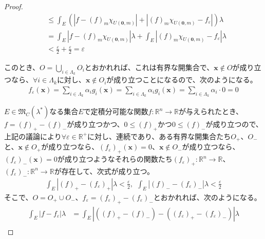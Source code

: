 \documentclass[dvipdfmx]{jsarticle}
\begin{document}
\begin{proof}
\begin{align*}
&\leq \int_{E} {\left( \left| f - (f)_{m}\chi_{U\left( \mathbf{0},m \right)} \right| + \left| (f)_{m}\chi_{U\left( \mathbf{0},m \right)} - f_{\varepsilon} \right| \right)\lambda}\\
&= \int_{E} {\left| f - (f)_{m}\chi_{U\left( \mathbf{0},m \right)} \right|\lambda} + \int_{E} {\left| (f)_{m}\chi_{U\left( \mathbf{0},m \right)} - f_{\varepsilon} \right|\lambda}\\
&< \frac{\varepsilon}{2} + \frac{\varepsilon}{2} = \varepsilon
\end{align*}\par
このとき、$O = \bigcup_{i \in \varLambda_{k}} O_{i}$とおかれれば、これは有界な開集合で、$\mathbf{x} \notin O$が成り立つなら、$\forall i \in \varLambda_{k}$に対し、$\mathbf{x} \notin O_{i}$が成り立つことになるので、次のようになる。
\begin{align*}
f_{\varepsilon}\left( \mathbf{x} \right) = \sum_{i \in \varLambda_{k}} {\alpha_{i}g_{i}}\left( \mathbf{x} \right) = \sum_{i \in \varLambda_{k}} {\alpha_{i}g_{i}\left( \mathbf{x} \right)} = \sum_{i \in \varLambda_{k}} {\alpha_{i} \cdot 0} = 0
\end{align*}\par
$E \in \mathfrak{M}_{C}\left( \lambda^{*} \right)$なる集合$E$で定積分可能な関数$f:\mathbb{R}^{n} \rightarrow \mathbb{R}$が与えられたとき、$f = (f)_{+} - (f)_{-}$が成り立つかつ、$0 \leq (f)_{+}$かつ$0 \leq (f)_{-}$が成り立つので、上記の議論により$\forall\varepsilon \in \mathbb{R}^{+}$に対し、連続であり、ある有界な開集合たち$O_{+}$、$O_{-}$と、$\mathbf{x} \notin O_{+}$が成り立つなら、$\left( f_{\varepsilon} \right)_{+}\left( \mathbf{x} \right) = 0$、$\mathbf{x} \notin O_{-}$が成り立つなら、$\left( f_{\varepsilon} \right)_{-}\left( \mathbf{x} \right) = 0$が成り立つようなそれらの関数たち$\left( f_{\varepsilon} \right)_{+}:\mathbb{R}^{n} \rightarrow \mathbb{R}$、$\left( f_{\varepsilon} \right)_{-}:\mathbb{R}^{n} \rightarrow \mathbb{R}$が存在して、次式が成り立つ。
\begin{align*}
\int_{E} {\left| (f)_{+} - \left( f_{\varepsilon} \right)_{+} \right|\lambda} < \frac{\varepsilon}{2},\ \ \int_{E} {\left| (f)_{-} - \left( f_{\varepsilon} \right)_{-} \right|\lambda} < \frac{\varepsilon}{2}
\end{align*}
そこで、$O = O_{+} \cup O_{-}$、$f_{\varepsilon} = \left( f_{\varepsilon} \right)_{+} - \left( f_{\varepsilon} \right)_{-}$とおかれれば、次のようになる。
\begin{align*}
\int_{E} {\left| f - f_{\varepsilon} \right|\lambda} &= \int_{E} {\left| \left( (f)_{+} - (f)_{-} \right) - \left( \left( f_{\varepsilon} \right)_{+} - \left( f_{\varepsilon} \right)_{-} \right) \right|\lambda}\\

\end{align*}
\end{proof}
\end{document}
